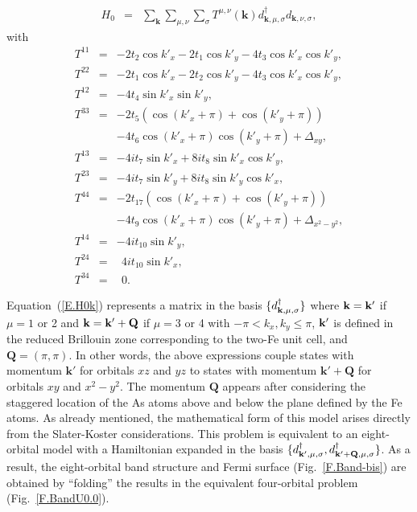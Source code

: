 \documentclass[aps,prb,superscriptaddress,preprintnumbers,
showpacs,legalpaper,twoside,twocolumn,amsmath,amssymb]{revtex4}
\begin{document}
\begin{eqnarray}\label{E.H0k}
H_0 &=& \sum_{\mathbf{k}} \sum_{\mu,\nu}\sum_\sigma T^{\mu,\nu}(\mathbf{k})
d^\dagger_{\mathbf{k},\mu,\sigma} d_{\mathbf{k},\nu,\sigma},
\end{eqnarray}
with
\begin{eqnarray}
T^{11} &=& -2t_2\cos k'_x -2t_1\cos k'_y -4t_3 \cos k'_x \cos k'_y, \label{eq:t11}\\
T^{22} &=& -2t_1\cos k'_x -2t_2\cos k'_y -4t_3 \cos k'_x \cos k'_y, \label{eq:t22}\\
T^{12} &=& -4t_4\sin k'_x \sin k'_y, \label{eq:t12}\\
T^{33} &=& -2t_5(\cos(k'_x+\pi)+\cos(k'_y+\pi)) \nonumber\\
       & & -4t_6\cos(k'_x+\pi)\cos(k'_y+\pi) +\Delta_{xy}, \\
T^{13} &=& -4it_7\sin k'_x + 8it_8\sin k'_x \cos k'_y, \\
T^{23} &=& -4it_7\sin k'_y + 8it_8\sin k'_y \cos k'_x, \\
T^{44} &=& -2t_{17}(\cos(k'_x+\pi)+\cos(k'_y+\pi)) \nonumber\\
       & & -4t_9\cos(k'_x+\pi)\cos(k'_y+\pi) +\Delta_{x^2-y^2}, \\
T^{14} &=& -4it_{10}\sin k'_y, \\
T^{24} &=& ~~4it_{10}\sin k'_x, \\
T^{34} &=& ~~0.
\end{eqnarray}

Equation~(\ref{E.H0k}) represents a
matrix in the basis $\{d^{\dagger}_{{\bf k},\mu,\sigma}\}$ where
${\bf k=k'}$ if $\mu=1$ or 2 and ${\bf k=k'+Q}$ if $\mu=3$ or 4 with
$-\pi<k_x, k_y\leq\pi$, ${\bf k'}$ is defined
in the reduced
Brillouin zone corresponding to the two-Fe unit cell, and
$\mathbf{Q}=(\pi,\pi)$.
In other words, the above expressions
couple states with momentum
$\mathbf{k'}$ for orbitals $xz$ and $yz$ to states with
momentum $\mathbf{k'+Q}$ for orbitals $xy$ and $x^2-y^2$.
The momentum $\mathbf{Q}$ appears
after considering the staggered location
of the As atoms above and below the plane defined by the Fe atoms.
As already mentioned,
the mathematical form of this model arises directly from
the Slater-Koster considerations.
This problem is equivalent to an eight-orbital model with
a Hamiltonian expanded in the basis $\{d^{\dagger}_{{\bf k'},\mu,\sigma},
d^{\dagger}_{{\bf k'+Q},\mu,\sigma}\}$.
As a result, the eight-orbital
band structure and Fermi surface (Fig.~\ref{F.Band-bis})
are obtained by ``folding'' the results in
the equivalent four-orbital problem (Fig.~\ref{F.BandU0.0}).
\end{document}
